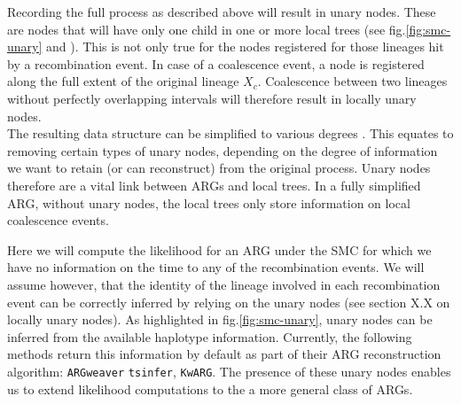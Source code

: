 \documentclass{article}
\newcommand{\tsinfer}[0]{\texttt{tsinfer}}
\newcommand{\kwarg}[0]{\texttt{KwARG}}
\newcommand{\argweaver}[0]{\texttt{ARGweaver}}
\begin{document}
Recording the full process as described above will result in unary nodes.
These are nodes that will have only one child in one or more local trees 
(see fig.\ref{fig:smc-unary} and \citet{Wong-2023}). This is not only true 
for the nodes registered for those lineages hit by a recombination event. 
In case of a coalescence event, a node is registered along the full 
extent of the original lineage $X_c$. 
Coalescence between two lineages without perfectly 
overlapping intervals will therefore result in locally unary nodes.\\


The resulting data structure can be simplified to various degrees \citep{Wong-2023}. 
This equates to removing certain types of unary nodes, 
depending on the degree of information 
we want to retain (or can reconstruct) from the original process. 
Unary nodes therefore are a vital link between 
ARGs and local trees. In a fully simplified ARG, without unary nodes, 
the local trees only store information on local coalescence events. 

Here we will compute the likelihood for an ARG
under the SMC for which we have no information on the time to any 
of the recombination events. 
We will assume however, that the identity 
of the lineage involved in each recombination event can be correctly 
inferred by relying on the unary nodes (see section X.X on locally unary nodes).
As highlighted in fig.\ref{fig:smc-unary}, unary nodes can be inferred from the 
available haplotype information. 
Currently, the following methods return this information by default 
as part of their ARG reconstruction algorithm: 
\argweaver \citep{rasmussen_genome_wide_2014} 
\tsinfer \citep{kelleher_inferring_2019}, 
\kwarg \citep{ignatieva_kwarg_2021}.
The presence of these unary nodes enables us to extend likelihood computations 
to the a more general class of ARGs.
\end{document}
